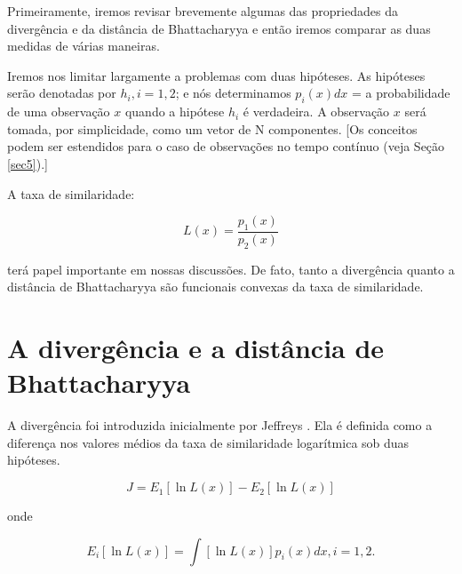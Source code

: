 \documentclass{sbrt2017port}
\begin{document}
Primeiramente, iremos revisar brevemente algumas das propriedades da divergência e da distância de Bhattacharyya e então iremos comparar as duas medidas de várias maneiras.

Iremos nos limitar largamente a problemas com duas hipóteses. As hipóteses serão denotadas por $h_i, i = 1,2$; e nós determinamos $p_i(x)dx $ =  a probabilidade de uma observação $x$ quando a hipótese $h_i$ é verdadeira. A observação $x$ será tomada, por simplicidade, como um vetor de N componentes. [Os conceitos podem ser estendidos para o caso de observações no tempo contínuo (veja Seção \ref{sec5}).]

A taxa de similaridade:

$$ L(x) = \frac{p_1(x)}{p_2(x)}$$

terá papel importante em nossas discussões. De fato, tanto a divergência quanto a distância de Bhattacharyya são funcionais  convexas da taxa de similaridade.

\section{A divergência e a distância de Bhattacharyya} \label{sec2}

A divergência foi introduzida inicialmente por Jeffreys \cite{r7,r16}. Ela é definida como a diferença nos valores médios da taxa de similaridade logarítmica sob duas hipóteses.

\begin{equation}
 J = E_1[\ln L(x)] - E_2[\ln L(x)]
 \label{eq1}
\end{equation}

onde

\begin{equation}
 E_i[\ln L(x)] = \int[\ln L(x)]p_i(x)dx, i = 1,2.
 \label{eq2}
\end{equation}
\end{document}
